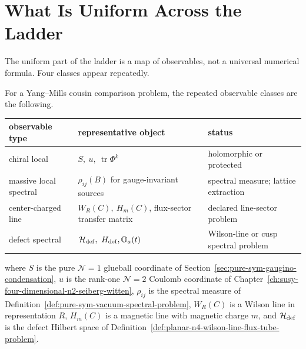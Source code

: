 \section{What Is Uniform Across the Ladder}
\label{sec:susy-ym-family-uniform-data}

The uniform part of the ladder is a map of observables, not a universal
numerical formula.  Four classes appear repeatedly.

\begin{definition}
\label{def:susy-ym-family-observable-table}
For a Yang--Mills cousin comparison problem, the repeated observable classes
are the following.
\begin{center}
\small
\begin{tabular}{p{}|p{}|p{}}
\textbf{observable type} & \textbf{representative object} & \textbf{status}\\
\hline
chiral local &
  \(S,\ u,\ \operatorname{tr}\Phi^k\) &
  holomorphic or protected\\
massive local spectral &
  \(\rho_{ij}(B)\) for gauge-invariant sources &
  spectral measure; lattice extraction\\
center-charged line &
  \(W_R(C),\ H_m(C)\), flux-sector transfer matrix &
  declared line-sector problem\\
defect spectral &
  \(\mathcal H_{\rm def},\ H_{\rm def},\mathbb O_a(t)\) &
  Wilson-line or cusp spectral problem
\end{tabular}
\end{center}
where \(S\) is the pure \(\mathcal N=1\) glueball coordinate of
Section~\ref{sec:pure-sym-gaugino-condensation}, \(u\) is the rank-one
\(\mathcal N=2\) Coulomb coordinate of
Chapter~\ref{ch:susy-four-dimensional-n2-seiberg-witten}, \(\rho_{ij}\) is
the spectral measure of
Definition~\ref{def:pure-sym-vacuum-spectral-problem}, \(W_R(C)\) is a Wilson
line in representation \(R\), \(H_m(C)\) is a magnetic line with magnetic
charge \(m\), and \(\mathcal H_{\rm def}\) is the defect Hilbert space of
Definition~\ref{def:planar-n4-wilson-line-flux-tube-problem}.
\end{definition}


